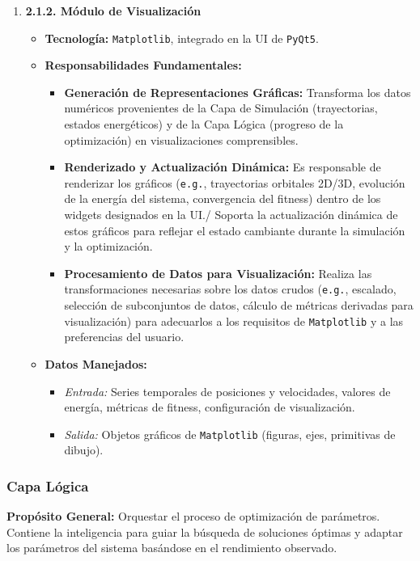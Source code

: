 \begin{enumerate}
    \item \textbf{2.1.2. Módulo de Visualización}
    \begin{itemize}
        \item \textbf{Tecnología:} \texttt{Matplotlib}, integrado en la UI de \texttt{PyQt5}.
        \item \textbf{Responsabilidades Fundamentales:}
        \begin{itemize}
            \item \textbf{Generación de Representaciones Gráficas:} Transforma los datos numéricos provenientes de la Capa de Simulación (trayectorias, estados energéticos) y de la Capa Lógica (progreso de la optimización) en visualizaciones comprensibles.
            \item \textbf{Renderizado y Actualización Dinámica:} Es responsable de renderizar los gráficos (\texttt{e.g.}, trayectorias orbitales 2D/3D, evolución de la energía del sistema, convergencia del fitness) dentro de los widgets designados en la UI./ Soporta la actualización dinámica de estos gráficos para reflejar el estado cambiante durante la simulación y la optimización.
            \item \textbf{Procesamiento de Datos para Visualización:} Realiza las transformaciones necesarias sobre los datos crudos (\texttt{e.g.}, escalado, selección de subconjuntos de datos, cálculo de métricas derivadas para visualización) para adecuarlos a los requisitos de \texttt{Matplotlib} y a las preferencias del usuario.
        \end{itemize}
        \item \textbf{Datos Manejados:}
        \begin{itemize}
            \item \textit{Entrada:} Series temporales de posiciones y velocidades, valores de energía, métricas de fitness, configuración de visualización.
            \item \textit{Salida:} Objetos gráficos de \texttt{Matplotlib} (figuras, ejes, primitivas de dibujo).
        \end{itemize}
    \end{itemize}
\end{enumerate}

\subsubsection{Capa Lógica}
\textbf{Propósito General:} Orquestar el proceso de optimización de parámetros. Contiene la inteligencia para guiar la búsqueda de soluciones óptimas y adaptar los parámetros del sistema basándose en el rendimiento observado.

